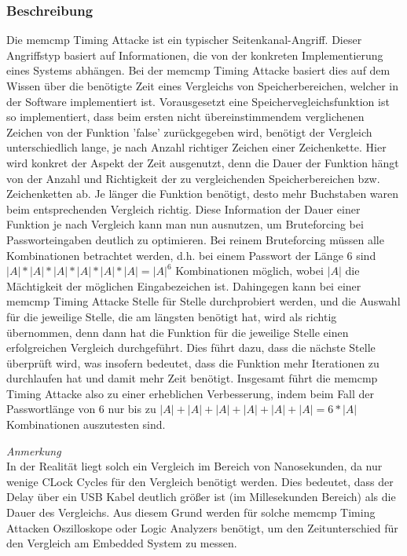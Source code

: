 \documentclass[a4paper,
DIV=13,
12pt,
BCOR=10mm,
department=FakIM,
oneside,
parskip=half,
automark,
listof=totocnumbered,
bibliography=totocnumbered,
acronym=totocnumbered
] {OTHRartcl}
\begin{document}
\subsubsection{Beschreibung}
Die memcmp Timing Attacke ist ein typischer Seitenkanal-Angriff. Dieser Angriffstyp basiert auf Informationen, die von der konkreten Implementierung eines Systems abhängen.
Bei der memcmp Timing Attacke basiert dies auf dem Wissen über die benötigte Zeit eines Vergleichs von Speicherbereichen, welcher in der Software implementiert ist. \cite{Hardware Hacking Handbook}
Vorausgesetzt eine Speichervegleichsfunktion ist so implementiert, dass beim ersten nicht übereinstimmendem verglichenen Zeichen von der Funktion 'false' zurückgegeben wird,
benötigt der Vergleich unterschiedlich lange, je nach Anzahl richtiger Zeichen einer Zeichenkette.
Hier wird konkret der Aspekt der Zeit ausgenutzt, denn die Dauer der Funktion hängt von der Anzahl und Richtigkeit der zu vergleichenden Speicherbereichen bzw. Zeichenketten ab.
Je länger die Funktion benötigt, desto mehr Buchstaben waren beim entsprechenden Vergleich richtig.
Diese Information der Dauer einer Funktion je nach Vergleich kann man nun ausnutzen, um Bruteforcing bei Passworteingaben deutlich zu optimieren.
Bei reinem Bruteforcing müssen alle Kombinationen betrachtet werden, d.h.
bei einem Passwort der Länge 6 sind $|A|*|A|*|A|*|A|*|A|*|A| = |A|^6$ Kombinationen möglich, wobei $|A|$ die Mächtigkeit der möglichen Eingabezeichen ist.
Dahingegen kann bei einer memcmp Timing Attacke Stelle für Stelle durchprobiert werden, und die Auswahl für die jeweilige Stelle, die am längsten benötigt hat,
wird als richtig übernommen, denn dann hat die Funktion für die jeweilige Stelle einen erfolgreichen Vergleich durchgeführt.
Dies führt dazu, dass die nächste Stelle überprüft wird, was insofern bedeutet, dass die Funktion mehr Iterationen zu durchlaufen hat und damit mehr Zeit benötigt.
Insgesamt führt die memcmp Timing Attacke also zu einer erheblichen Verbesserung, indem beim Fall der Passwortlänge von 6
nur bis zu $ |A|+|A|+|A|+|A|+|A|+|A| = 6 * |A| $ Kombinationen auszutesten sind. \cite{Hardware Hacking Handbook}

\textit{Anmerkung} \mbox{} \\
In der Realität liegt solch ein Vergleich im Bereich von Nanosekunden, da nur wenige CLock Cycles für den Vergleich benötigt werden.
Dies bedeutet, dass der Delay über ein USB Kabel deutlich größer ist (im Millesekunden Bereich) als die Dauer des Vergleichs.
Aus diesem Grund werden für solche memcmp Timing Attacken Oszilloskope oder Logic Analyzers benötigt, um den Zeitunterschied
für den Vergleich am Embedded System zu messen. \cite{Hardware Hacking Handbook}
\end{document}
